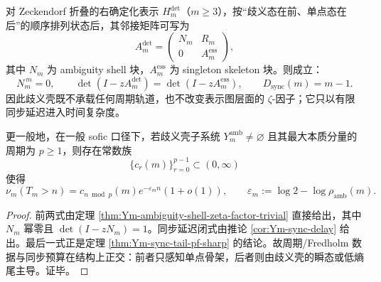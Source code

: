 \begin{theorem}[瞬态壳与周期谱的严格正交]\label{thm:xi-time-part9x-transient-shell-periodic-spectrum-orthogonality}
对 Zeckendorf 折叠的右确定化表示 \(H_m^{\det}\)（\(m\ge 3\)），按“歧义态在前、单点态在后”的顺序排列状态后，其邻接矩阵可写为
\[
A_m^{\det}
=
\begin{pmatrix}
N_m & R_m\\
0 & A_m^{\mathrm{ess}}
\end{pmatrix},
\]
其中 \(N_m\) 为 ambiguity shell 块，\(A_m^{\mathrm{ess}}\) 为 singleton skeleton 块。则成立：
\[
N_m^{\,m}=0,
\qquad
\det(I-zA_m^{\det})=\det(I-zA_m^{\mathrm{ess}}),
\qquad
D_{\mathrm{sync}}(m)=m-1.
\]
因此歧义壳既不承载任何周期轨道，也不改变表示图层面的 \(\zeta\)-因子；它只以有限同步延迟进入时间复杂度。

更一般地，在一般 sofic 口径下，若歧义壳子系统 \(Y_m^{\mathrm{amb}}\neq\varnothing\) 且其最大本质分量的周期为 \(p\ge 1\)，则存在常数族
\[
\{c_r(m)\}_{r=0}^{p-1}\subset(0,\infty)
\]
使得
\[
\nu_m(T_m>n)=c_{n\bmod p}(m)e^{-\varepsilon_m n}(1+o(1)),
\qquad
\varepsilon_m:=\log 2-\log\rho_{\mathrm{amb}}(m).
\]
\end{theorem}
\begin{proof}
前两式由定理 \ref{thm:Ym-ambiguity-shell-zeta-factor-trivial} 直接给出，其中 \(N_m\) 幂零且 \(\det(I-zN_m)=1\)。同步延迟闭式由推论 \ref{cor:Ym-sync-delay} 给出。最后一式正是定理 \ref{thm:Ym-sync-tail-pf-sharp} 的结论。故周期/Fredholm 数据与同步预算在结构上正交：前者只感知单点骨架，后者则由歧义壳的瞬态或低熵尾主导。证毕。
\end{proof}

